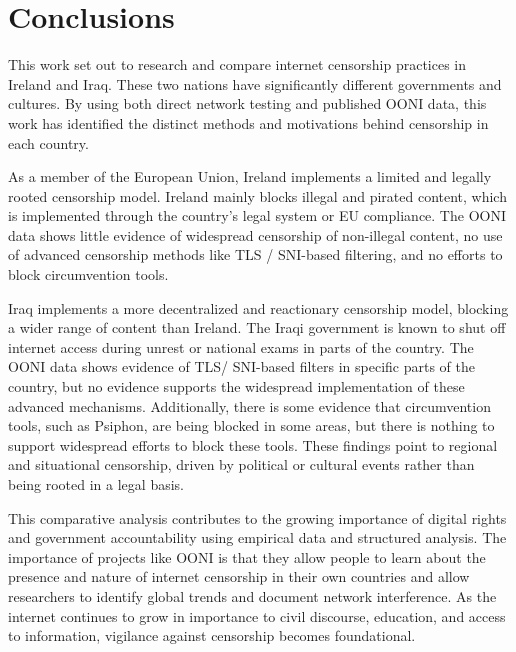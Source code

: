 \chapter{Conclusions}

This work set out to research and compare internet censorship practices in Ireland and Iraq. These two nations have significantly different governments and cultures. By using both direct network testing and published OONI data, this work has identified the distinct methods and motivations behind censorship in each country. 

As a member of the European Union, Ireland implements a limited and legally rooted censorship model. Ireland mainly blocks illegal and pirated content, which is implemented through the country's legal system or EU compliance. The OONI data shows little evidence of widespread censorship of non-illegal content, no use of advanced censorship methods like TLS / SNI-based filtering, and no efforts to block circumvention tools.

Iraq implements a more decentralized and reactionary censorship model, blocking a wider range of content than Ireland. The Iraqi government is known to shut off internet access during unrest or national exams in parts of the country. The OONI data shows evidence of TLS/ SNI-based filters in specific parts of the country, but no evidence supports the widespread implementation of these advanced mechanisms. Additionally, there is some evidence that circumvention tools, such as Psiphon, are being blocked in some areas, but there is nothing to support widespread efforts to block these tools. These findings point to regional and situational censorship, driven by political or cultural events rather than being rooted in a legal basis.

This comparative analysis contributes to the growing importance of digital rights and government accountability using empirical data and structured analysis. The importance of projects like OONI is that they allow people to learn about the presence and nature of internet censorship in their own countries and allow researchers to identify global trends and document network interference. As the internet continues to grow in importance to civil discourse, education, and access to information, vigilance against censorship becomes foundational.